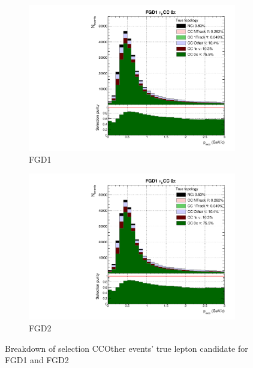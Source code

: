 \begin{figure}[h]
	\begin{subfigure}[t]{0.49\textwidth}
		\includegraphics[width=\textwidth,page=6, trim={0mm 0mm 0mm 9mm}, clip]{figures/mach3/selection/2017b_Diag_WithSelection}
		\caption{FGD1}
	\end{subfigure}
	\begin{subfigure}[t]{0.49\textwidth}
		\includegraphics[width=\textwidth,page=12, trim={0mm 0mm 0mm 9mm}, clip]{figures/mach3/selection/2017b_Diag_WithSelection}
		\caption{FGD2}
	\end{subfigure}
	\caption{Breakdown of selection CCOther events' true lepton candidate for FGD1 and FGD2 }
	\label{fig:ccoth_muon}
\end{figure}

